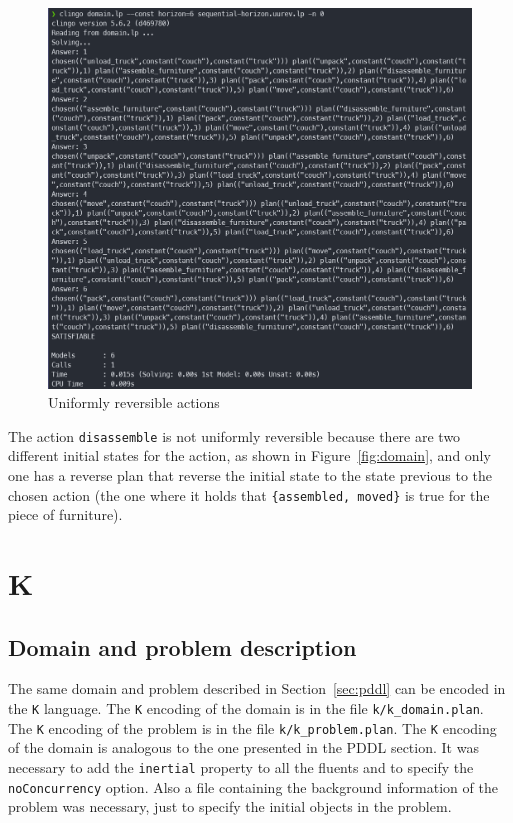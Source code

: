 \documentclass[12pt]{article}
\begin{document}
    \begin{figure}[ht]
        \centering
        \includegraphics[width=\textwidth]{../img/unif_rev_actions}
        \caption{Uniformly reversible actions}
        \label{fig:pddl-reversible}
    \end{figure}
    The action \texttt{disassemble} is not uniformly reversible because there are two different initial states for the action, as shown in Figure~\ref{fig:domain}, and only one has a reverse plan that reverse the initial state to the state previous to the chosen action (the one where it holds that \texttt{\{assembled, moved\}} is true for the piece of furniture).

    \section{K}\label{sec:k}
    \subsection{Domain and problem description}\label{subsec:k-domain}
    The same domain and problem described in Section~\ref{sec:pddl} can be encoded in the \texttt{K} language.
    The \texttt{K} encoding of the domain is in the file \texttt{k/k\_domain.plan}.
    The \texttt{K} encoding of the problem is in the file \texttt{k/k\_problem.plan}.
    The \texttt{K} encoding of the domain is analogous to the one presented in the PDDL section.
    It was necessary to add the \texttt{inertial} property to all the fluents and to specify the \texttt{noConcurrency} option.
    Also a file containing the background information of the problem was necessary, just to specify the initial objects in the problem.
\end{document}
